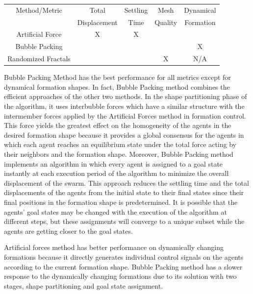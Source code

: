 \begin{center}
 \label{worst_performance} 
\begin{tabular}{||c| c| c | c | c||}
				
\hline
Method/Metric & Total  &Settling & Mesh & Dynamical\\ 
                       & Displacement  & Time & Quality & Formation\\
\hline
Artificial Force & X & X & & \\
Bubble Packing & &  & & X\\	
Randomized Fractals & &  & X & N/A \\	
\hline
\end{tabular}
\end{center}
		
Bubble Packing Method has the best performance for all metrics except for dynamical formation shapes. In fact, Bubble Packing method combines the efficient approaches of the other two methods. In the shape partitioning phase of the algorithm, it uses interbubble forces which have a similar structure with the intermember forces applied by the Artificial Forces method in formation control. This force yields the greatest  effect on the homogeneity of the agents in the desired formation shape because it provides a global consensus for the agents in which each agent reaches an equilibrium state under the total force acting by their neighbors and the formation shape. Moreover, Bubble Packing method implements an algorithm in which every agent is assigned to a goal state instantly at each execution period of the algorithm to minimize the overall displacement of the swarm. This approach reduces the settling time and the total displacements of the agents from the initial state to their final states since their final positions in the formation shape is predetermined. It is possible that the agents' goal states may be changed with the execution of the algorithm at different steps, but these assignments will converge to a unique subset while the agents are getting closer to the goal states. 

Artificial forces method has better performance on dynamically changing formations because it directly generates individual control signals on the agents according to the current formation shape. Bubble Packing method has a slower response to the dynamically changing formations due to its solution with two stages, shape partitioning and goal state assignment. 
		
